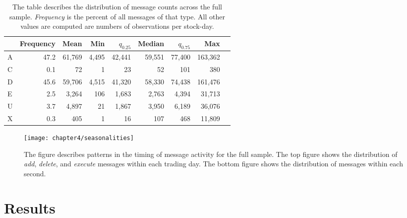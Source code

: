 \begin{table}[t]
\small
\linespread{1}
\centering
\captionsetup{position=below, font=footnotesize, justification=justified, width=\linewidth}
\caption[Message counts]{The table describes the distribution of message counts across the full sample. \textit{Frequency} is the percent of all messages of that type. All other values are computed are numbers of observations per stock-day.}
\label{tab:message_counts}
\begin{tabular*}{\textwidth}{@{\extracolsep{\fill}}lrrrrrrrr}
	\toprule{}
	 &  Frequency  &   Mean  & Min &  $q_{0.25}$ &  Median &    $q_{0.75}$   &        Max \\
	\midrule
	A &  47.2  &  61,769 &  4,495 &  42,441 &  59,551 &  77,400 &  163,362 \\
	C &  0.1   &      72 &     1  &      23 &      52 &     101 &      380 \\
	D &  45.6  &  59,706 &  4,515 &  41,320 &  58,330 &  74,438 &  161,476 \\
	E &  2.5   &   3,264 &   106  &   1,683 &   2,763 &   4,394 &   31,713 \\
	U &  3.7   &   4,897 &     21 &   1,867 &   3,950 &   6,189 &   36,076 \\
	X &  0.3   &     405 &      1 &      16 &     107 &     468 &   11,809 \\
	\bottomrule
\end{tabular*}
\end{table}

\begin{figure}[t]
\small
\linespread{1}
\centering
\texttt{[image: chapter4/seasonalities]}
\captionsetup{skip=-20pt, labelsep=colon, font=footnotesize, width=\linewidth, justification=justified}
\caption[Message activity seasonalities]{The figure describes patterns in the timing of message activity for the full sample. The top figure shows the distribution of \textit{add}, \textit{delete}, and \textit{execute} messages within each trading day. The bottom figure shows the distribution of messages within each second.}
\label{fig:seasonalities}
\end{figure}


\section{Results}

